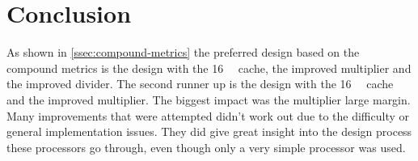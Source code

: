 \documentclass[final]{article}
\begin{document}
\section{Conclusion}
\label{sec:conclusion}
As shown in \cref{ssec:compound-metrics} the preferred design based on the compound metrics is the design with the \SI{16}{\kibi\byte} cache, the improved multiplier and the improved divider.
The second runner up is the design with the \SI{16}{\kibi\byte} cache and the improved multiplier.
The biggest impact was the multiplier large margin.
Many improvements that were attempted didn't work out due to the difficulty or general implementation issues.
They did give great insight into the design process these processors go through, even though only a very simple processor was used.
\end{document}
